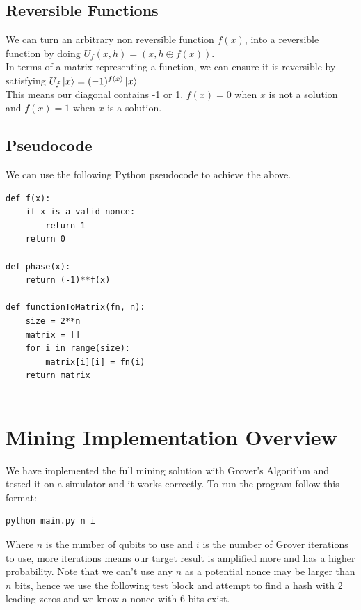 \documentclass[11pt]{article} %
\begin{document}
\subsection{Reversible Functions}{}


\noindent We can turn an arbitrary non reversible function $f(x)$, into a reversible function by doing $U_{f} (x, h) = (x, h \oplus  f(x))$. \\

\noindent In terms of a matrix representing a function, we can ensure it is reversible by satisfying $U_f \ket{x} = (-1)^{f(x)} \ket{x}$\\

\noindent This means our diagonal contains -1 or 1. $f(x) = 0$ when $x$ is not a solution and $f(x) = 1$ when $x$ is a solution.

 \subsection{Pseudocode}{}
We can use the following Python pseudocode to achieve the above.
\begin{Verbatim}[tabsize=4]
def f(x):	
	if x is a valid nonce:
		return 1
	return 0

def phase(x):
	return (-1)**f(x)

def functionToMatrix(fn, n):
	size = 2**n
	matrix = []
	for i in range(size):
		matrix[i][i] = fn(i)
	return matrix
	
\end{Verbatim} 

\section{Mining Implementation Overview}{}
We have implemented the full mining solution with Grover's Algorithm and tested it on a simulator and it works correctly. To run the program follow this format:

\begin{verbatim}
python main.py n i
\end{verbatim}

\noindent Where $n$ is the number of qubits to use and $i$ is the number of Grover iterations to use, more iterations means our target result is amplified more and has a higher probability. Note that we can't use any $n$ as a potential nonce may be larger than $n$ bits, hence we use the following test block and attempt to find a hash with 2 leading zeros and we know a nonce with 6  bits exist.\\
\end{document}

